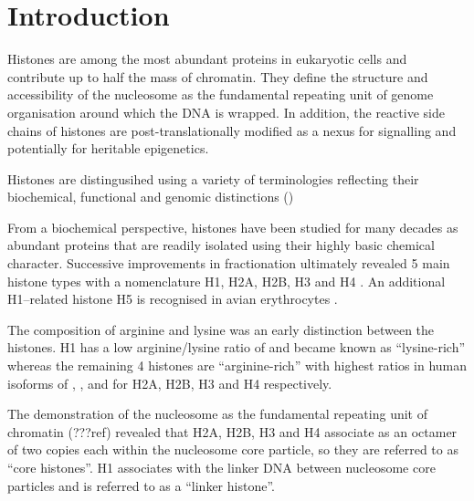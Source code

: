 \section{Introduction}

  Histones are among the most abundant proteins in eukaryotic cells and contribute up to half the mass of chromatin. 
  They define the structure and accessibility of the nucleosome as the fundamental repeating unit of genome organisation 
  around which the DNA is wrapped.
  In addition, the reactive side chains of histones are post-translationally modified 
  as a nexus for signalling and potentially for heritable epigenetics. 

  Histones are distingusihed using a variety of terminologies
  reflecting their biochemical, functional and genomic distinctions ()
  
  From a biochemical perspective, histones have been studied for many decades 
  as abundant proteins that are readily isolated using their highly basic chemical character. 
  Successive improvements in fractionation ultimately revealed 5 main histone types 
  with a nomenclature H1, H2A, H2B, H3 and H4 \citep{nomenclature}.
  An additional H1--related histone H5 is recognised in avian erythrocytes \citep{HFive-review}.

  The composition of arginine and lysine was an early distinction between the histones. 
  H1 has a low arginine/lysine ratio of \LinkerArgLysRatio{} and became known as ``lysine-rich'' 
  whereas the remaining 4 histones are ``arginine-rich'' with highest ratios in human isoforms of 
  \HTwoAArgLysRatio{},  \HTwoBArgLysRatio{}, \HThreeArgLysRatio{} and \HFourArgLysRatio{}
  for H2A, H2B, H3 and H4 respectively.

  The demonstration of the nucleosome as the fundamental repeating unit of chromatin (???ref) 
  revealed that H2A, H2B, H3 and H4 associate as an octamer of two copies each within the
  nucleosome core particle, so they are referred to as ``core histones''. 
  H1 associates with the linker DNA between nucleosome core particles and is referred to as a ``linker histone''.

